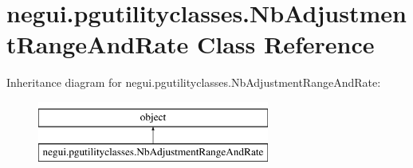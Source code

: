 \hypertarget{classnegui_1_1pgutilityclasses_1_1NbAdjustmentRangeAndRate}{}\section{negui.\+pgutilityclasses.\+Nb\+Adjustment\+Range\+And\+Rate Class Reference}
\label{classnegui_1_1pgutilityclasses_1_1NbAdjustmentRangeAndRate}
Inheritance diagram for negui.\+pgutilityclasses.\+Nb\+Adjustment\+Range\+And\+Rate\+:\begin{figure}[H]
\begin{center}
\leavevmode
\includegraphics[height=2.000000cm]{classnegui_1_1pgutilityclasses_1_1NbAdjustmentRangeAndRate}
\end{center}
\end{figure}

